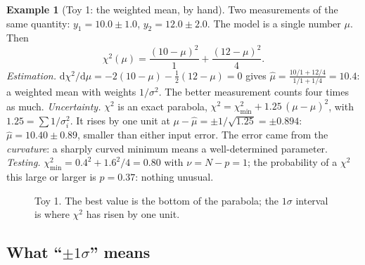 \documentclass[11pt,a4paper]{article}
\numberwithin{equation}{section}
\theoremstyle{definition}
\newtheorem{example}[definition]{Example}
\theoremstyle{plain}
\theoremstyle{remark}
\numberwithin{algorithm}{section}
\newcommand{\dd}{\mathrm{d}}
\begin{document}
\begin{example}[Toy 1: the weighted mean, by hand]\label{ex:wmean}
Two measurements of the same quantity: $y_1=10.0\pm1.0$, $y_2=12.0\pm2.0$. The model is a single number $\mu$. Then
\[
\chi^2(\mu)=\frac{(10-\mu)^2}{1}+\frac{(12-\mu)^2}{4}.
\]
\emph{Estimation.} $\dd\chi^2/\dd\mu=-2(10-\mu)-\frac12(12-\mu)=0$ gives $\hat\mu=\frac{10/1+12/4}{1/1+1/4}=10.4$: a weighted mean with weights $1/\sigma^2$. The better measurement counts four times as much.
\emph{Uncertainty.} $\chi^2$ is an exact parabola, $\chi^2=\chi^2_{\min}+1.25\,(\mu-\hat\mu)^2$, with $1.25=\sum1/\sigma_i^2$. It rises by one unit at $\mu-\hat\mu=\pm1/\sqrt{1.25}=\pm0.894$: $\hat\mu=10.40\pm0.89$, smaller than either input error. The error came from the \emph{curvature}: a sharply curved minimum means a well-determined parameter.
\emph{Testing.} $\chi^2_{\min}=0.4^2+1.6^2/4=0.80$ with $\nu=N-p=1$; the probability of a $\chi^2$ this large or larger is $p=0.37$: nothing unusual.
\end{example}

\begin{figure}[h]\centering
{}
\caption{Toy 1. The best value is the bottom of the parabola; the $1\sigma$ interval is where $\chi^2$ has risen by one unit.}\label{fig:pr-parabola}
\end{figure}

\subsection{\texorpdfstring{What ``$\pm1\sigma$'' means}{What plus-minus one sigma means}}\label{sec:pr-sigma}
\end{document}
